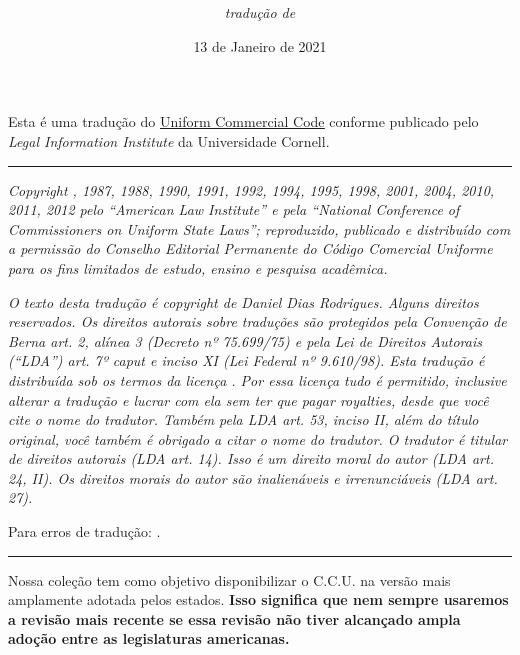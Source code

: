 \documentclass[a4paper, 12pt]{article}
\title{\textbf{\titulo}}
\author{\textit{tradução de}\\\autor}
\date{13 de Janeiro de 2021}
\begin{document}
\maketitle

Esta é uma tradução do \href{https://www.law.cornell.edu/ucc}{\underline{Uniform Commercial Code}} conforme publicado pelo \textit{Legal Information Institute} da Universidade Cornell.

\begin{center}
\rule{7cm}{0.4pt}
\end{center}

\textit{Copyright , 1987, 1988, 1990, 1991, 1992, 1994, 1995, 1998, 2001, 2004, 2010, 2011, 2012 pelo ``American Law Institute'' e pela ``National Conference of Commissioners on Uniform State Laws''; reproduzido, publicado e distribuído com a permissão do Conselho Editorial Permanente do Código Comercial Uniforme para os fins limitados de estudo, ensino e pesquisa acadêmica.}

\vspace{5mm}

\textit{O texto desta tradução é copyright  de Daniel Dias Rodrigues. Alguns direitos reservados. Os direitos autorais sobre traduções são protegidos pela Convenção de Berna art. 2, alínea 3 (Decreto nº 75.699/75) e pela Lei de Direitos Autorais (``LDA'') art. 7º caput e inciso XI (Lei Federal nº 9.610/98). Esta tradução é distribuída sob os termos da licença \href{https://creativecommons.org/licenses/by/4.0/deed.pt_BR}{\underline{}}. Por essa licença tudo é permitido, inclusive alterar a tradução e lucrar com ela sem ter que pagar royalties, desde que você cite o nome do tradutor. Também pela LDA art. 53, inciso II, além do título original, você também é obrigado a citar o nome do tradutor. O tradutor é titular de direitos autorais (LDA art. 14). Isso é um direito moral do autor (LDA art. 24, II). Os direitos morais do autor são inalienáveis e irrenunciáveis (LDA art. 27).}

\vspace{5mm}

Para erros de tradução: \href{mailto:danieldiasr@gmail.com}{\underline{}}.

\begin{center}
\rule{7cm}{0.4pt}
\end{center}

Nossa coleção tem como objetivo disponibilizar o C.C.U. na versão mais amplamente adotada pelos estados. \textbf{Isso significa que nem sempre usaremos a revisão mais recente se essa revisão não tiver alcançado ampla adoção entre as legislaturas americanas.}
\end{document}
